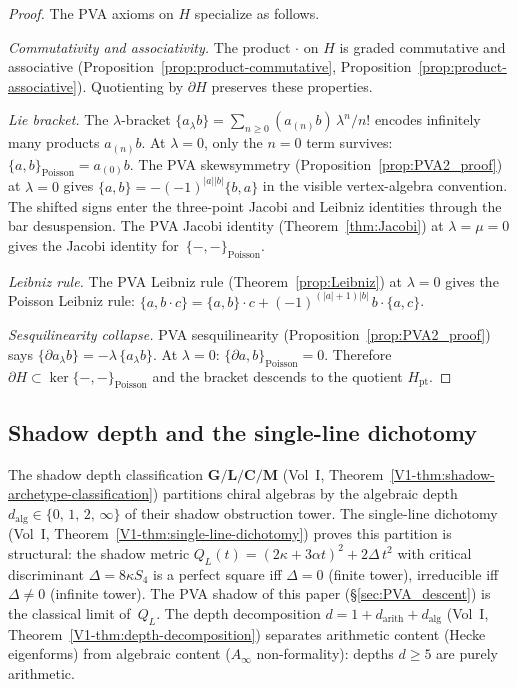 \begin{proof}
The PVA axioms on $H$ specialize as follows.

\emph{Commutativity and associativity.}
The product $\cdot$ on $H$ is graded commutative and associative
(Proposition~\ref{prop:product-commutative},
Proposition~\ref{prop:product-associative}). Quotienting by $\partial H$
preserves these properties.

\emph{Lie bracket.}
The $\lambda$-bracket $\{a {}_\lambda b\} = \sum_{n \geq 0}
(a_{(n)} b)\, \lambda^n / n!$ encodes infinitely many products
$a_{(n)} b$. At $\lambda = 0$, only the $n = 0$ term survives:
$\{a, b\}_{\mathrm{Poisson}} = a_{(0)} b$. The PVA skewsymmetry
(Proposition~\ref{prop:PVA2_proof}) at $\lambda = 0$ gives
$\{a, b\} = -(-1)^{|a||b|}\{b, a\}$ in the visible
vertex-algebra convention. The shifted signs enter the three-point
Jacobi and Leibniz identities through the bar desuspension. The PVA
Jacobi identity (Theorem~\ref{thm:Jacobi}) at $\lambda = \mu = 0$
gives the Jacobi identity for~$\{-,-\}_{\mathrm{Poisson}}$.

\emph{Leibniz rule.}
The PVA Leibniz rule (Theorem~\ref{prop:Leibniz}) at $\lambda = 0$
gives the Poisson Leibniz rule:
$\{a, b \cdot c\} = \{a, b\} \cdot c +
(-1)^{(|a|+1)|b|}\, b \cdot \{a, c\}$.

\emph{Sesquilinearity collapse.}
PVA sesquilinearity (Proposition~\ref{prop:PVA2_proof}) says
$\{\partial a {}_\lambda b\} = -\lambda\, \{a {}_\lambda b\}$.
At $\lambda = 0$: $\{\partial a, b\}_{\mathrm{Poisson}} = 0$.
Therefore $\partial H \subset \ker\{-,-\}_{\mathrm{Poisson}}$
and the bracket descends to the quotient $H_{\mathrm{pt}}$.
\end{proof}

\subsection{Shadow depth and the single-line dichotomy}

The shadow depth classification
$\mathbf{G}/\mathbf{L}/\mathbf{C}/\mathbf{M}$
(Vol~I, Theorem~\ref*{V1-thm:shadow-archetype-classification})
partitions chiral algebras by the algebraic depth
$d_{\mathrm{alg}} \in \{0,\,1,\,2,\,\infty\}$ of their
shadow obstruction tower. The single-line dichotomy
(Vol~I, Theorem~\ref*{V1-thm:single-line-dichotomy})
proves this partition is structural: the shadow metric
$Q_L(t) = (2\kappa{+}3\alpha t)^2 + 2\Delta\,t^2$
with critical discriminant $\Delta = 8\kappa S_4$
is a perfect square iff $\Delta = 0$ (finite tower),
irreducible iff $\Delta \neq 0$ (infinite tower).
The PVA shadow of this paper
(\S\ref{sec:PVA_descent}) is the classical limit of~$Q_L$.
The depth decomposition
$d = 1 + d_{\mathrm{arith}} + d_{\mathrm{alg}}$
(Vol~I, Theorem~\ref*{V1-thm:depth-decomposition})
separates arithmetic content (Hecke eigenforms) from
algebraic content ($A_\infty$ non-formality):
depths $d \geq 5$ are purely arithmetic.

